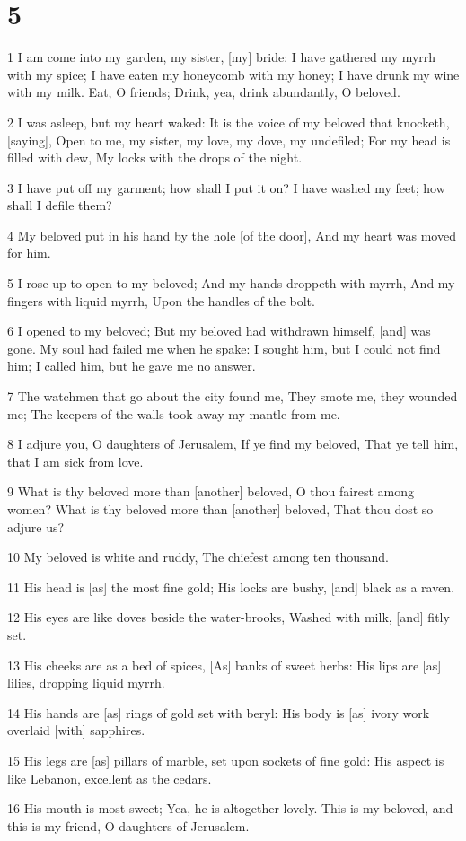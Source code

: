 \chapter{5}

\par 1 I am come into my garden, my sister, [my] bride: I have gathered my myrrh with my spice; I have eaten my honeycomb with my honey; I have drunk my wine with my milk. Eat, O friends; Drink, yea, drink abundantly, O beloved.
\par 2 I was asleep, but my heart waked: It is the voice of my beloved that knocketh, [saying], Open to me, my sister, my love, my dove, my undefiled; For my head is filled with dew, My locks with the drops of the night.
\par 3 I have put off my garment; how shall I put it on? I have washed my feet; how shall I defile them?
\par 4 My beloved put in his hand by the hole [of the door], And my heart was moved for him.
\par 5 I rose up to open to my beloved; And my hands droppeth with myrrh, And my fingers with liquid myrrh, Upon the handles of the bolt.
\par 6 I opened to my beloved; But my beloved had withdrawn himself, [and] was gone. My soul had failed me when he spake: I sought him, but I could not find him; I called him, but he gave me no answer.
\par 7 The watchmen that go about the city found me, They smote me, they wounded me; The keepers of the walls took away my mantle from me.
\par 8 I adjure you, O daughters of Jerusalem, If ye find my beloved, That ye tell him, that I am sick from love.
\par 9 What is thy beloved more than [another] beloved, O thou fairest among women? What is thy beloved more than [another] beloved, That thou dost so adjure us?
\par 10 My beloved is white and ruddy, The chiefest among ten thousand.
\par 11 His head is [as] the most fine gold; His locks are bushy, [and] black as a raven.
\par 12 His eyes are like doves beside the water-brooks, Washed with milk, [and] fitly set.
\par 13 His cheeks are as a bed of spices, [As] banks of sweet herbs: His lips are [as] lilies, dropping liquid myrrh.
\par 14 His hands are [as] rings of gold set with beryl: His body is [as] ivory work overlaid [with] sapphires.
\par 15 His legs are [as] pillars of marble, set upon sockets of fine gold: His aspect is like Lebanon, excellent as the cedars.
\par 16 His mouth is most sweet; Yea, he is altogether lovely. This is my beloved, and this is my friend, O daughters of Jerusalem.

